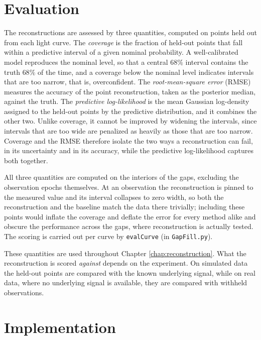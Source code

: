 \section{Evaluation}
\label{sec:evaluation}

The reconstructions are assessed by three quantities, computed on points held out from each light curve. The \textit{coverage} is the fraction of held-out points that fall within a predictive interval of a given nominal probability. A well-calibrated model reproduces the nominal level, so that a central $68\%$ interval contains the truth $68\%$ of the time, and a coverage below the nominal level indicates intervals that are too narrow, that is, overconfident. The \textit{root-mean-square error} (RMSE) measures the accuracy of the point reconstruction, taken as the posterior median, against the truth. The \textit{predictive log-likelihood} is the mean Gaussian log-density assigned to the held-out points by the predictive distribution, and it combines the other two. Unlike coverage, it cannot be improved by widening the intervals, since intervals that are too wide are penalized as heavily as those that are too narrow. Coverage and the RMSE therefore isolate the two ways a reconstruction can fail, in its uncertainty and in its accuracy, while the predictive log-likelihood captures both together.

All three quantities are computed on the interiors of the gaps, excluding the observation epochs themselves. At an observation the reconstruction is pinned to the measured value and its interval collapses to zero width, so both the reconstruction and the baseline match the data there trivially; including these points would inflate the coverage and deflate the error for every method alike and obscure the performance across the gaps, where reconstruction is actually tested. The scoring is carried out per curve by \texttt{evalCurve} (in \texttt{GapFill.py}).

These quantities are used throughout Chapter \ref{chap:reconstruction}. What the reconstruction is scored \textit{against} depends on the experiment. On simulated data the held-out points are compared with the known underlying signal, while on real data, where no underlying signal is available, they are compared with withheld observations.

\section{Implementation}
\label{sec:implementation}

